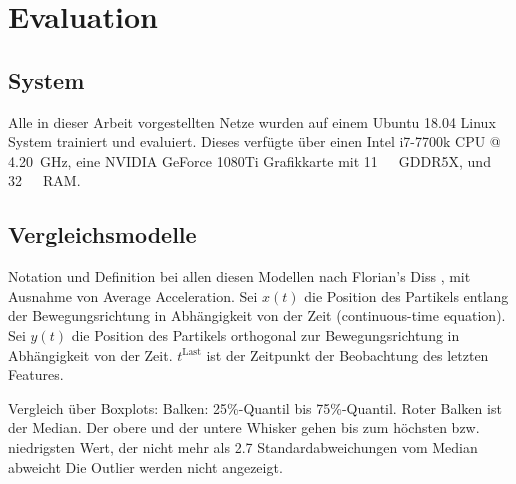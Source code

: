 \chapter{Evaluation}


\section{System}

Alle in dieser Arbeit vorgestellten Netze wurden auf einem Ubuntu 18.04 Linux System trainiert und evaluiert.
Dieses verfügte über einen Intel i7-7700k CPU @ \SI{4.20}{\giga\hertz}, eine NVIDIA GeForce 1080Ti Grafikkarte mit \SI{11}{\giga\byte}~GDDR5X,
und \SI{32}{\giga\byte}~RAM. 


\section{Vergleichsmodelle}

\color{blue}
Notation und Definition bei allen diesen Modellen nach Florian's Diss \cite{Pfaff2018}, mit Ausnahme von Average Acceleration.
Sei \(x(t)\) die Position des Partikels entlang der Bewegungsrichtung in Abhängigkeit von der Zeit
(continuous-time equation).
Sei \( y(t)\) die Position des Partikels orthogonal zur Bewegungsrichtung in Abhängigkeit von der Zeit.
\(t^{\text{Last}}\) ist der Zeitpunkt der Beobachtung des letzten Features.

Vergleich über Boxplots: Balken: 25\%-Quantil bis 75\%-Quantil.
Roter Balken ist der Median. Der obere und der untere Whisker 
gehen bis zum höchsten bzw. niedrigsten Wert, der nicht mehr als 2.7 Standardabweichungen vom Median abweicht
Die Outlier werden nicht angezeigt.

\color{black}

